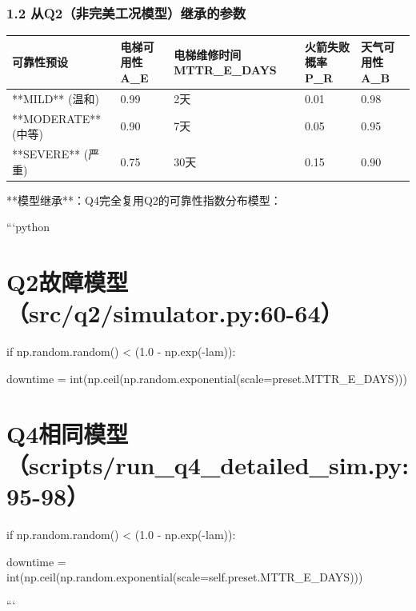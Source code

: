 \documentclass[a4paper,12pt]{article}
\begin{document}
\subsubsection{1.2 从Q2（非完美工况模型）继承的参数}
\begin{center}
\begin{longtable}{|l|l|l|l|l|}
\hline
可靠性预设 & 电梯可用性 A_E & 电梯维修时间 MTTR_E_DAYS & 火箭失败概率 P_R & 天气可用性 A_B \\ \hline
**MILD** (温和) & 0.99 & 2天 & 0.01 & 0.98 \\ \hline
**MODERATE** (中等) & 0.90 & 7天 & 0.05 & 0.95 \\ \hline
**SEVERE** (严重) & 0.75 & 30天 & 0.15 & 0.90 \\ \hline
\end{longtable}
\end{center}
**模型继承**：Q4完全复用Q2的可靠性指数分布模型：

\par
```python

\par
\section{Q2故障模型（src/q2/simulator.py:60-64）}
if np.random.random() < (1.0 - np.exp(-lam)):

\par
downtime = int(np.ceil(np.random.exponential(scale=preset.MTTR\_E\_DAYS)))

\par
\section{Q4相同模型（scripts/run_q4_detailed_sim.py:95-98）}
if np.random.random() < (1.0 - np.exp(-lam)):

\par
downtime = int(np.ceil(np.random.exponential(scale=self.preset.MTTR\_E\_DAYS)))

\par
```

\par
\end{document}
